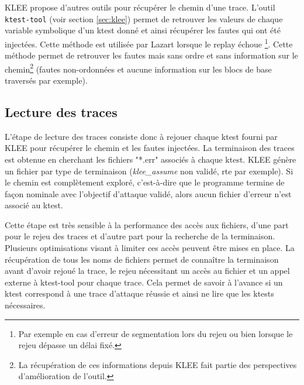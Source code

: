             KLEE propose d'autres outils pour récupérer le chemin d'une trace. L'outil \texttt{ktest-tool} (voir section \ref{sec:klee}) permet de retrouver les valeurs de chaque variable symbolique d'un ktest donné et ainsi récupérer les fautes qui ont été injectées. Cette méthode est utilisée par Lazart lorsque le replay échoue \footnote{Par exemple en cas d'erreur de segmentation lors du rejeu ou bien lorsque le rejeu dépasse un délai fixé.}. Cette méthode permet de retrouver les fautes mais sans ordre et sans information sur le chemin\footnote{La récupération de ces informations depuis KLEE fait partie des perspectives d'amélioration de l'outil.} (fautes non-ordonnées et aucune information sur les blocs de base traversés par exemple).
 	
        \subsection{Lecture des traces}
        \label{sec:lazart-impl-klee-read}
        
            L'étape de lecture des traces consiste donc à rejouer chaque ktest fourni par KLEE pour récupérer le chemin et les fautes injectées.
            La terminaison des traces est obtenue en cherchant les fichiers "*.err" associés à chaque ktest. KLEE génère un fichier par type de terminaison (\textit{klee\_assume} non validé, \gls{rte} par exemple). Si le chemin est complètement exploré, c'est-à-dire que le programme termine de façon nominale avec l'objectif d'attaque validé, alors aucun fichier d'erreur n'est associé au ktest.
            
            Cette étape est très sensible à la performance des accès aux fichiers, d'une part pour le rejeu des traces et d'autre part pour la recherche de la terminaison. Plusieurs optimisations visant à limiter ces accès peuvent être mises en place.
            La récupération de tous les noms de fichiers permet de connaître la terminaison avant d'avoir rejoué la trace, le rejeu nécessitant un accès au fichier et un appel externe à ktest-tool pour chaque trace.
            Cela permet de savoir à l'avance si un ktest correspond à une trace d'attaque réussie et ainsi ne lire que les ktests nécessaires.
            
